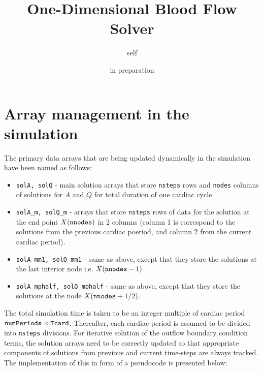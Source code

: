 \documentclass{article}
\title{One-Dimensional Blood Flow Solver}
\author{self}
\date{in preparation}
\begin{document}
\maketitle

\section*{Array management in the simulation}
The primary data arrays that are being updated dynamically in the simulation have been named as follows:
\begin{itemize}
\item \verb+solA, solQ+ - main solution arrays that store \verb+nsteps+ rows and \verb+nodes+ columns of solutions for $A$ and $Q$ for total duration of one cardiac cycle
\item \verb+solA_m, solQ_m+ - arrays that store \verb+nsteps+ rows of data for the solution at the end point $X(\verb+nnodes+)$ in 2 columns (column 1 is correspond to the solutions from the previous cardiac poeriod, and column 2 from the current cardiac period).
\item \verb+solA_mm1, solQ_mm1+ - same as above, except that they store the solutions at the last interior node i.e. $X(\verb+nnodes+-1)$
\item \verb+solA_mphalf, solQ_mphalf+ - same as above, except that they store the solutions at the node $X(\verb+nnodes+ + 1/2)$.
\end{itemize}

The total simulation time is taken to be an integer multiple of cardiac period $\verb+numPeriods+ \times \verb+Tcard+$. Thereafter, each cardiac period is assumed to be divided into \verb+nsteps+ divisions. For iterative solution of the outflow boundary condition terms, the solution arrays need to be correctly updated so that appropriate components of solutions from previous and current time-steps are always tracked. The implementation of this in form of a pseudocode is presented below:
\end{document}
